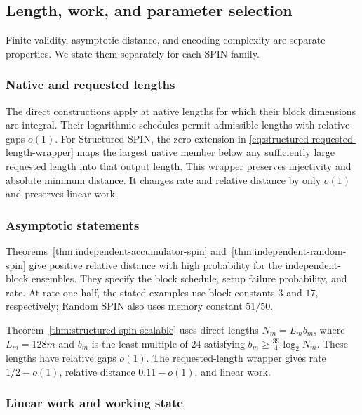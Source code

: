 \subsection{Length, work, and parameter selection}
\label{sec:scaling}

Finite validity, asymptotic distance, and encoding complexity are separate
properties. We state them separately for each SPIN family.

\subsubsection{Native and requested lengths}

The direct constructions apply at native lengths for which their block
dimensions are integral. Their logarithmic schedules permit admissible lengths
with relative gaps \(o(1)\). For Structured SPIN, the zero extension in
\eqref{eq:structured-requested-length-wrapper} maps the largest native member
below any sufficiently large requested length into that output length. This wrapper preserves
injectivity and absolute minimum distance. It changes rate and relative
distance by only $o(1)$ and preserves linear work.

\subsubsection{Asymptotic statements}

Theorems~\ref{thm:independent-accumulator-spin}
and~\ref{thm:independent-random-spin} give positive relative distance with
high probability for the independent-block ensembles. They specify the block
schedule, setup failure probability, and rate. At rate one half, the stated
examples use block constants \(3\) and \(17\), respectively; Random SPIN also
uses memory constant \(51/50\).

Theorem~\ref{thm:structured-spin-scalable} uses direct lengths
$N_m=L_mb_m$, where $L_m=128m$ and $b_m$ is the least multiple of $24$
satisfying $b_m\ge\frac{39}{4}\log_2N_m$. These lengths have relative gaps $o(1)$.
The requested-length wrapper gives rate $1/2-o(1)$, relative distance
$0.11-o(1)$, and linear work.

\subsubsection{Linear work and working state}

